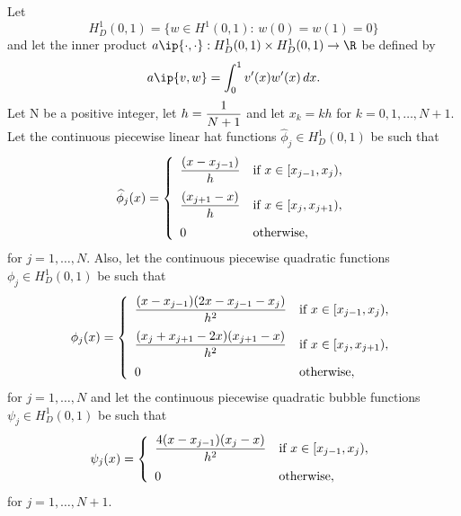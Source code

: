 
Let
\[
H^1_D(0,1)=\{w\in H^1(0,1):\,w(0)=w(1)=0\}
\]
and let the inner product $a\ip{\cdot,\cdot}:H^1_D(0,1)\times H^1_D(0,1)\to\R$ be defined by
\[
a\ip{v,w}=\int_0^1v'(x)w'(x)\,dx.
\]
Let N be a positive integer, let $\displaystyle{h={1 \over N+1}}$ and let $x_k=kh$ for $k=0,1,\ldots,N+1$. Let the continuous piecewise linear hat functions $\widehat{\phi}_j\in H^1_D(0,1)$ be such that
\[
\widehat{\phi}_j(x) = \left\{\begin{array}{ll}
\displaystyle{{(x-x_{j-1}) \over h}} & \displaystyle{\mbox{if }x\in[x_{j-1},x_j)},
\\[10pt]
\displaystyle{{(x_{j+1}-x) \over h}} & \displaystyle{\mbox{if }x\in[x_j,x_{j+1})},
\\[10pt]
0 & \mbox{otherwise},
\end{array}\right.
\]
for $j=1,\ldots,N$. Also, let the continuous piecewise quadratic functions $\phi_j\in H^1_D(0,1)$ be such that
\[
\phi_j(x)=\left\{\begin{array}{ll}
\displaystyle{{(x-x_{j-1})(2x-x_{j-1}-x_j) \over h^2}} & \displaystyle{\mbox{if }x\in[x_{j-1},x_j)},
\\[10pt]
\displaystyle{{(x_j+x_{j+1}-2x)(x_{j+1}-x) \over h^2}} & \displaystyle{\mbox{if }x\in[x_j,x_{j+1})},
\\[10pt]
0 & \mbox{otherwise},
\end{array}\right.
\]
for $j=1,\ldots,N$ and let the continuous piecewise quadratic bubble functions $\psi_j\in H^1_D(0,1)$ be such that
\[
\psi_j(x)=\left\{\begin{array}{ll}
\displaystyle{{4(x-x_{j-1})(x_j-x) \over h^2}} & \displaystyle{\mbox{if }x\in[x_{j-1},x_j)},
\\[10pt]
0 & \mbox{otherwise},
\end{array}\right.
\]
for $j=1,\ldots,N+1$.
\\
